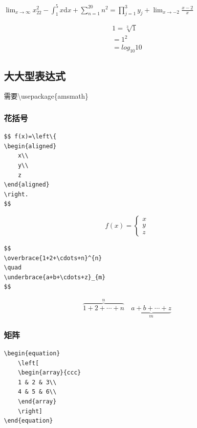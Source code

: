 \documentclass{article}
\begin{document}
	$ \lim_{x \to \infty} x^2_{22} - \int_{1}^{5}x\mathrm{d}x + \sum_{n=1}^{20} n^{2} = \prod_{j=1}^{3} y_{j}  + \lim_{x \to -2} \frac{x-2}{x} $
	
	\begin{equation}
		\begin{split}
		1 = \sqrt[3]{1} \\ 
		= 1^2 \\
		= log_{10}{10}
		\end{split}
	\end{equation}



	
	\subsection{大大型表达式}
	需要\textbackslash usepackage\{amsmath\}
	\subsubsection{花括号}
	
	\begin{lstlisting}
$$ f(x)=\left\{
\begin{aligned}
	x\\
	y\\
	z
\end{aligned}
\right.
$$
	\end{lstlisting}	
	
	$$ f(x)=\left\{
	\begin{aligned}
		x\\
		y\\
		z
	\end{aligned}
	\right.
	$$
	
	\begin{lstlisting}
$$
\overbrace{1+2+\cdots+n}^{n}
\quad
\underbrace{a+b+\cdots+z}_{m}
$$
	\end{lstlisting}
	
	$$
	\overbrace{1+2+\cdots+n}^{n}
	\quad
	\underbrace{a+b+\cdots+z}_{m}
	$$
	
	\subsubsection{矩阵}
	\begin{lstlisting}
\begin{equation}
	\left[
	\begin{array}{ccc}
	1 & 2 & 3\\
	4 & 5 & 6\\
	\end{array}
	\right]
\end{equation}
	\end{lstlisting}
	
\end{document}
